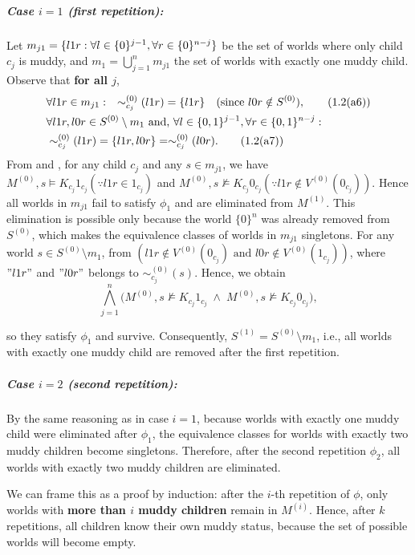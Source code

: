 \subparagraph{Case $i=1$ (first repetition):} 
Let $m_{j1} = \{ l1r : \forall l \in \{0\}^{j-1}, \forall r \in \{0\}^{n-j} \}$ be the set of
 worlds where only child $c_j$ is muddy, 
and $m_1 = \bigcup_{j=1}^{n} m_{j1}$ the set 
of worlds with exactly one muddy child. 
Observe that \textbf{for all $j$},
\begin{align*}
    &\forall l1r \in m_{j1}: \quad 
        \sim_{c_j}^{(0)}(l1r) = \{l1r\} \quad 
            (\text{since } l0r \notin S^{(0)}), \tag{1.2(a6)}\label{eq:1.2(a6)}\\
    &\forall l1r,l0r \in S^{(0)} \setminus m_1 \text{ and, } \forall l \in \{0,1\}^{j-1}, \forall r \in \{0,1\}^{n-j}: \\ 
        &\sim_{c_j}^{(0)}(l1r) = \{l1r,l0r\} = \sim_{c_j}^{(0)}(l0r). 
        \tag{1.2(a7)}\label{eq:1.2(a7)}
\end{align*}
From  and , for any child $c_j$ and any $s \in m_{j1}$,
we have
$M^{(0)},s \models K_{c_j}1_{c_j} (\because l1r \in 1_{c_j})$
 and $M^{(0)},s 
\not\models K_{c_j}0_{c_j} (\because l1r \not\in V^{(0)}(0_{c_j})) $. 
Hence all worlds in $m_{j1}$ fail to satisfy 
$\phi_1$ and are eliminated from $M^{(1)}$. 
This elimination is possible only because the world 
$\{0\}^n$ was already removed from $S^{(0)}$, 
which makes the equivalence classes of worlds in $m_{j1}$ singletons. 
For any world $s \in S^{(0)} \setminus m_1$, 
from 
\( (l1r \not\in V^{(0)}(0_{c_j})\text{ and }l0r \not\in V^{(0)}(1_{c_j}) )\),
where $"l1r"$ and $"l0r"$ belongs to $\sim_{c_j}^{(0)}(s)$.
Hence, we obtain
\[
\bigwedge_{j=1}^{n} \big( M^{(0)},s \not\models K_{c_j}1_{c_j} 
\;\land\; M^{(0)},s \not\models K_{c_j}0_{c_j} \big),
\]

so they satisfy $\phi_1$ and survive. Consequently,
$S^{(1)} = S^{(0)} \setminus m_1$, 
i.e., all worlds with exactly one muddy 
child are removed after the first repetition.

\subparagraph{Case $i=2$ (second repetition):} 
By the same reasoning as in case $i=1$, 
because worlds with exactly one muddy child were eliminated 
after $\phi_1$, the equivalence classes for worlds with exactly 
two muddy children become singletons. 
Therefore, after the second repetition $\phi_2$, 
all worlds with exactly two muddy children are eliminated.

We can frame this as a proof by induction: 
after the $i$-th repetition of $\phi$, 
only worlds with \textbf{more than $i$ muddy children} 
remain in $M^{(i)}$. Hence, after $k$ repetitions, 
all children know their own muddy status,
because the set of possible worlds will become empty.

